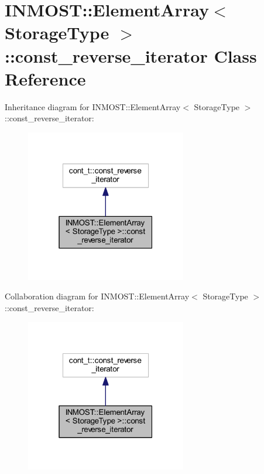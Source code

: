 \hypertarget{classINMOST_1_1ElementArray_1_1const__reverse__iterator}{\section{I\-N\-M\-O\-S\-T\-:\-:Element\-Array$<$ Storage\-Type $>$\-:\-:const\-\_\-reverse\-\_\-iterator Class Reference}
\label{classINMOST_1_1ElementArray_1_1const__reverse__iterator}
}


Inheritance diagram for I\-N\-M\-O\-S\-T\-:\-:Element\-Array$<$ Storage\-Type $>$\-:\-:const\-\_\-reverse\-\_\-iterator\-:
\nopagebreak
\begin{figure}[H]
\begin{center}
\leavevmode
\includegraphics[width=199pt]{classINMOST_1_1ElementArray_1_1const__reverse__iterator__inherit__graph}
\end{center}
\end{figure}


Collaboration diagram for I\-N\-M\-O\-S\-T\-:\-:Element\-Array$<$ Storage\-Type $>$\-:\-:const\-\_\-reverse\-\_\-iterator\-:
\nopagebreak
\begin{figure}[H]
\begin{center}
\leavevmode
\includegraphics[width=199pt]{classINMOST_1_1ElementArray_1_1const__reverse__iterator__coll__graph}
\end{center}
\end{figure}
